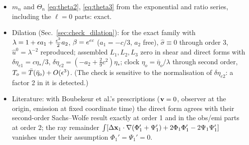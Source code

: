 \begin{itemize}
\item[R-5] $m_n$ and $\Theta_n$ \eqref{eq:theta2}, \eqref{eq:theta3} from the exponential and ratio series, including the $\ell=0$ parts: exact.
\item[R-6] Dilation (Sec.~\ref{sec:check_dilation}): for the exact family with $\lambda=1+\epsilon a_1+\tfrac{\epsilon^2}2a_2$, $\beta=e^{\epsilon c}$ ($a_1=-c/3$, $a_2$ free), $\hat\sigma\equiv0$ through order 3, $\hat u^0=\lambda^{-2}$ reproduced; assembled $L_1,L_2,L_3$ zero in shear and direct forms with $\delta\eta_{e1}=c\eta_*/3$, $\delta\eta_{e2}=(-a_2+\tfrac29c^2)\eta_*$; clock $\eta_o=\bar\eta_o/\lambda$ through second order, $T_o=\bar T(\bar\eta_o)+O(\epsilon^3)$.  (The check is sensitive to the normalisation of $\delta\eta_{e2}$: a factor 2 in it is detected.)
\item[R-7] Literature: with Boubekeur et al.'s prescriptions ($\mathbf v=0$, observer at the origin, emission at fixed coordinate time) the direct form agrees with their second-order Sachs--Wolfe result exactly at order 1 and in the obs/emi parts at order 2; the ray remainder $\int[\Delta\mathbf x_1\cdot\nabla(\Phi_1'+\Psi_1')+2\Phi_1\Phi_1'-2\Psi_1\Psi_1']$ vanishes under their assumption $\Phi_1'=\Psi_1'=0$.
\end{itemize}

